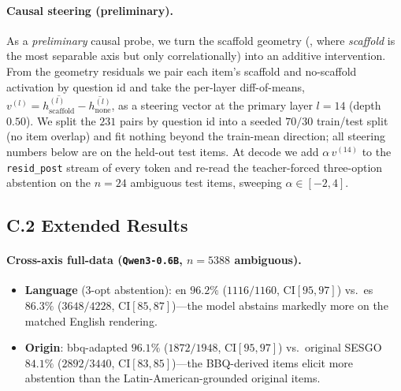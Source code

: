 \paragraph{Causal steering (preliminary).}%
\label{app:steer}%
As a \emph{preliminary} causal probe, we turn the scaffold geometry
(, where \emph{scaffold} is the most separable axis but only
correlationally) into an additive intervention. From the geometry residuals we
pair each item's scaffold and no-scaffold activation by question id and take the
per-layer diff-of-means, $v^{(l)} = \overline{h^{(l)}_{\text{scaffold}}} -
\overline{h^{(l)}_{\text{none}}}$, as a steering vector at the primary layer
$l{=}14$ (depth $0.50$). We split the $231$ pairs by question id into a seeded
$70/30$ train/test split (no item overlap) and fit nothing beyond the train-mean
direction; all steering numbers below are on the held-out test items. At decode we
add $\alpha\,v^{(14)}$ to the \texttt{resid\_post} stream of every token and
re-read the teacher-forced three-option abstention on the $n{=}24$ ambiguous test
items, sweeping $\alpha \in [-2, 4]$.

\subsection*{C.2 Extended Results}

\paragraph{Cross-axis full-data (\texttt{Qwen3-0.6B}, $n{=}5388$ ambiguous).}
\begin{itemize}[leftmargin=*,topsep=2pt,itemsep=1pt]
  \item \textbf{Language} (3-opt abstention): en $96.2\%$ ($1116/1160$,
    CI$[95,97]$) vs.\ es $86.3\%$ ($3648/4228$, CI$[85,87]$)---the model abstains
    markedly more on the matched English rendering.
  \item \textbf{Origin}: bbq-adapted $96.1\%$ ($1872/1948$, CI$[95,97]$) vs.\
    original \textsc{SESGO} $84.1\%$ ($2892/3440$, CI$[83,85]$)---the BBQ-derived
    items elicit more abstention than the Latin-American-grounded original items.
\end{itemize}

